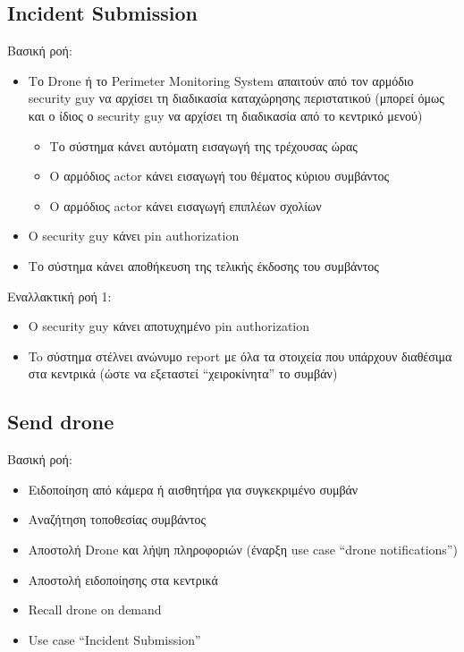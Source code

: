 \documentclass{article}
\begin{document}
\subsection{Incident Submission}

\noindent Βασική ροή:
\begin{itemize}
    \item Το Drone ή το Perimeter Monitoring System απαιτούν από τον αρμόδιο security guy να αρχίσει τη διαδικασία καταχώρησης περιστατικού (μπορεί όμως και ο ίδιος ο security guy να αρχίσει τη διαδικασία από το κεντρικό μενού)
    \begin{itemize}
        \item Το σύστημα κάνει αυτόματη εισαγωγή της τρέχουσας ώρας
        \item Ο αρμόδιος actor κάνει εισαγωγή του θέματος κύριου συμβάντος
        \item Ο αρμόδιος actor κάνει εισαγωγή επιπλέων σχολίων
    \end{itemize}
    \item Ο security guy κάνει pin authorization
    \item Το σύστημα κάνει αποθήκευση της τελικής έκδοσης του συμβάντος
\end{itemize}

\noindent Εναλλακτική ροή 1:
\begin{itemize}
    \item Ο security guy κάνει αποτυχημένο pin authorization
    \item To σύστημα στέλνει ανώνυμο report με όλα τα στοιχεία που υπάρχουν διαθέσιμα στα κεντρικά (ώστε να εξεταστεί “χειροκίνητα” το συμβάν)
\end{itemize}

\subsection{Send drone}

\noindent Βασική ροή:
\begin{itemize}
    \item Ειδοποίηση από κάμερα ή αισθητήρα για συγκεκριμένο συμβάν
    \item Αναζήτηση τοποθεσίας συμβάντος
    \item Αποστολή Drone και λήψη πληροφοριών (έναρξη use case “drone notifications”)
    \item Αποστολή ειδοποίησης στα κεντρικά
    \item Recall drone on demand
    \item Use case “Incident Submission”
\end{itemize}
\end{document}
